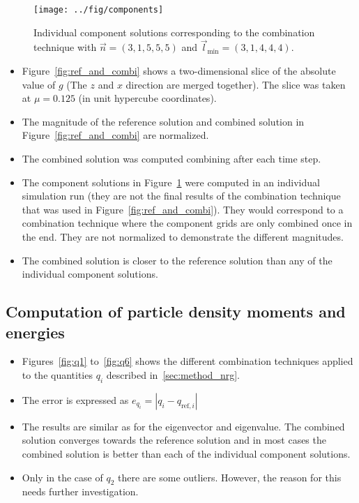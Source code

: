 \documentclass{scrartcl}
\newcommand{\lmin}{\vec{l}_{\text{min}}}
\begin{document}
\begin{figure}[h]
	\centering
	\texttt{[image: ../fig/components]}
	\caption{Individual component solutions corresponding to the combination technique with $\vec n = (3,1,5,5,5)$ and $\lmin = (3,1,4,4,4)$.}
	\label{fig:components}
\end{figure}

\begin{itemize}
	\item Figure~\ref{fig:ref_and_combi} shows a two-dimensional slice of the absolute value of $g$ (The $z$ and $x$ direction are merged together). The slice was taken at $\mu = 0.125$ (in unit hypercube coordinates). 
	\item The magnitude of the reference solution and combined solution in Figure~\ref{fig:ref_and_combi} are normalized.
	\item The combined solution was computed combining after each time step.
	\item The component solutions in Figure~\ref{fig:components} were computed in an individual simulation run (they are not the final results of the combination technique that was used in Figure~\ref{fig:ref_and_combi}).
	They would correspond to a combination technique where the component grids are only combined once in the end.
	They are not normalized to demonstrate the different magnitudes.
	\item The combined solution is closer to the reference solution than any of the individual component solutions.
\end{itemize}

\subsection*{Computation of particle density moments and energies}

\begin{itemize}
	\item Figures~\ref{fig:q1} to~\ref{fig:q6} shows the different combination techniques applied to the quantities $q_i$ described in~\ref{sec:method_nrg}. 
	\item The error is expressed as $e_{q_i} = | q_i - q_{\text{ref},i} |$
	\item The results are similar as for the eigenvector and eigenvalue. The combined solution converges towards the reference solution and in most cases the combined solution is better than each of the individual component solutions. 
	\item Only in the case of $q_2$ there are some outliers. However, the reason for this needs further investigation.
\end{itemize}
\end{document}
